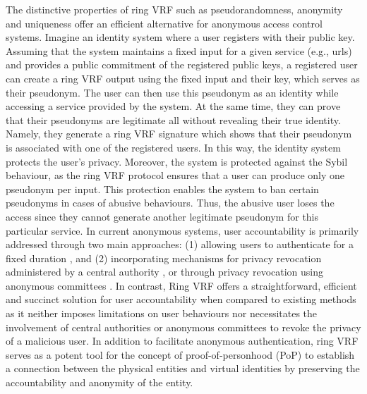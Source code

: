 The distinctive properties of ring VRF such as pseudorandomness, anonymity and uniqueness offer  an efficient alternative for anonymous access control systems. Imagine an identity system where a user registers with their public key. Assuming that the system maintains a fixed input for a given service (e.g., urls) and provides a public commitment of the registered public keys, a registered user  can create a ring VRF output using the fixed input and their key, which serves as their pseudonym.  The user can then use this pseudonym as an identity while accessing a service provided by the system. At the same time, they can prove that their pseudonyms  are  legitimate  all without revealing their true identity. Namely, they generate a ring VRF signature which shows that their pseudonym is associated with one of the registered users. In this way, the identity system protects the user's  privacy. Moreover, the  system is protected against the Sybil behaviour, as the ring VRF protocol ensures that a user can produce only one pseudonym per input. This protection enables the system to ban certain pseudonyms in cases of abusive behaviours. Thus, the abusive user loses the access since they cannot generate  another legitimate pseudonym for this particular service.
In current anonymous systems, user accountability is primarily addressed through two main approaches: (1) allowing users to authenticate for a fixed duration \cite{limited_authentication1,limited_authentication2,limited_authentication3}, and (2) incorporating mechanisms for privacy revocation administered by a central authority \cite{revocation1,revocation2,revocation3,revocation4}, or through privacy revocation using anonymous committees \cite{anonymous-committee1,anonymous-committee2}.
In contrast, Ring VRF offers a straightforward, efficient and succinct solution for user accountability when compared to existing methods as it neither imposes limitations on user behaviours nor necessitates the involvement of central authorities or anonymous committees to revoke the privacy of a malicious user.
In addition to facilitate anonymous authentication, ring VRF  serves as a potent tool for the concept of proof-of-personhood (PoP) \cite{pop2008,pop2017,pop2020} to establish a connection between the physical entities and virtual identities by preserving the accountability and anonymity of the entity. 


